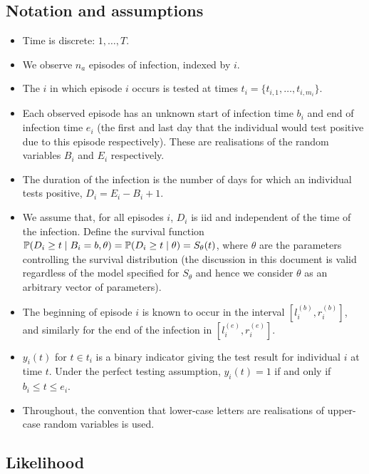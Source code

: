 \documentclass[thesis.tex]{subfiles}
\begin{document}
\subsection{Notation and assumptions}
\begin{itemize}
\item
  Time is discrete: $1, \dots, T$.
\item
  We observe $n_a$ episodes of infection, indexed by $i$.
\item
  The $i$ in which episode $i$ occurs is tested at times
  $t_i = \{ t_{i,1}, \dots, t_{i,m_i} \}$.
\item
  Each observed episode has an unknown start of infection time $b_i$
  and end of infection time $e_i$ (the first and last day that the
  individual would test positive due to this episode respectively).
  These are realisations of the random variables $B_i$ and $E_i$
  respectively.
\item
  The duration of the infection is the number of days for which an
  individual tests positive, $D_i = E_i - B_i + 1$.
\item
  We assume that, for all episodes $i$, $D_i$ is iid and independent
  of the time of the infection. Define the survival function
  $\operatorname{\mathbb{P}}(D_i \geq t \mid B_i = b, \theta) = \operatorname{\mathbb{P}}(D_i \geq t \mid \theta) = S_\theta(t)$,
  where $\theta$ are the parameters controlling the survival
  distribution (the discussion in this document is valid regardless of
  the model specified for $S_\theta$ and hence we consider $\theta$
  as an arbitrary vector of parameters).
\item
  The beginning of episode $i$ is known to occur in the interval
  $[l_i^{(b)}, r_i^{(b)}]$, and similarly for the end of the infection
  in $[l_i^{(e)}, r_i^{(e)}]$.
\item
  $y_i(t)$ for $t \in t_i$ is a binary indicator giving the test
  result for individual $i$ at time $t$. Under the perfect testing
  assumption, $y_i(t) = 1$ if and only if $b_i \leq t \leq e_i$.
\item
  Throughout, the convention that lower-case letters are realisations of
  upper-case random variables is used.
\end{itemize}

\subsection{Likelihood}\label{perf-test:sec:likelihood}
\end{document}
